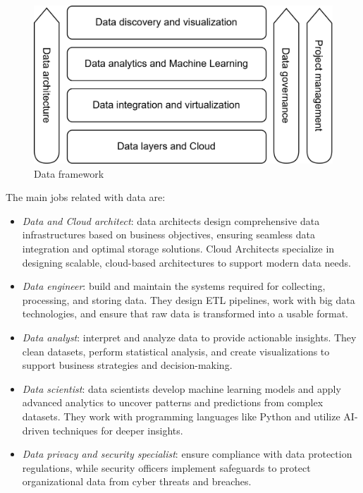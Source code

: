 \begin{figure}[H]
    \centering
    \includegraphics[width=0.5\linewidth]{images/bis10.png}
    \caption{Data framework}
\end{figure}

The main jobs related with data are: 
\begin{itemize}
    \item \textit{Data and Cloud architect}: data architects design comprehensive data infrastructures based on business objectives, ensuring seamless data integration and optimal storage solutions. 
        Cloud Architects specialize in designing scalable, cloud-based architectures to support modern data needs.
    \item \textit{Data engineer}: build and maintain the systems required for collecting, processing, and storing data. 
        They design ETL pipelines, work with big data technologies, and ensure that raw data is transformed into a usable format.
    \item \textit{Data analyst}: interpret and analyze data to provide actionable insights. 
        They clean datasets, perform statistical analysis, and create visualizations to support business strategies and decision-making.
    \item \textit{Data scientist}: data scientists develop machine learning models and apply advanced analytics to uncover patterns and predictions from complex datasets. 
        They work with programming languages like Python and utilize AI-driven techniques for deeper insights.
    \item \textit{Data privacy and security specialist}: ensure compliance with data protection regulations, while security officers implement safeguards to protect organizational data from cyber threats and breaches.
\end{itemize}


















